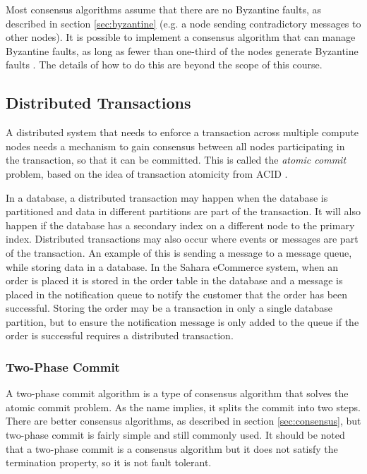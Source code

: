 Most consensus algorithms assume that there are no Byzantine faults, as described in section \ref{sec:byzantine}
(e.g. a node sending contradictory messages to other nodes).
It is possible to implement a consensus algorithm that can manage Byzantine faults,
as long as fewer than one-third of the nodes generate Byzantine faults \cite{byzantine-tolerance-2002}.
The details of how to do this are beyond the scope of this course.

\subsection{Distributed Transactions}

A distributed system that needs to enforce a transaction across multiple compute nodes
needs a mechanism to gain consensus between all nodes participating in the transaction, so that it can be committed.
This is called the \emph{atomic commit} problem, based on the idea of transaction atomicity from ACID \cite{distributed2-notes}.

In a database, a distributed transaction may happen when the database is partitioned and data in different partitions are part of the transaction.
It will also happen if the database has a secondary index on a different node to the primary index.
Distributed transactions may also occur where events or messages are part of the transaction.
An example of this is sending a message to a message queue, while storing data in a database.
In the Sahara eCommerce system, when an order is placed it is stored in the order table in the database
and a message is placed in the notification queue to notify the customer that the order has been successful.
Storing the order may be a transaction in only a single database partition,
but to ensure the notification message is only added to the queue if the order is successful requires a distributed transaction.

\subsubsection{Two-Phase Commit}\label{sec:2pr}
A two-phase commit algorithm is a type of consensus algorithm that solves the atomic commit problem.
As the name implies, it splits the commit into two steps.
There are better consensus algorithms, as described in section \ref{sec:consensus},
but two-phase commit is fairly simple and still commonly used.
It should be noted that a two-phase commit is a consensus algorithm
but it does not satisfy the termination property, so it is not fault tolerant.

